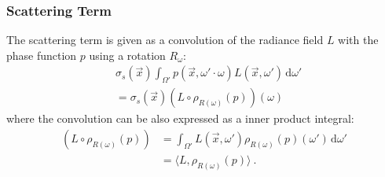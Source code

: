 \documentclass{egpubl}
\newcommand{\ud}{\,\mathrm{d}} %
\begin{document}
\subsubsection{Scattering Term}

The scattering term is given as a convolution of the radiance field $L$ with the phase function $p$ using a rotation $R_\omega$:
\begin{align*}
&
\sigma_s(\vec{x})\int_{\Omega'}p(\vec{x}, \omega'\cdot\omega)L(\vec{x}, \omega')\ud\omega'
\\
&= \sigma_s(\vec{x})(L\circ \rho_{R(\omega)}(p))(\omega)
\end{align*}
where the convolution can be also expressed as a inner product integral:
\begin{align*}
(L\circ \rho_{R(\omega)}(p)) &= \int_{\Omega'}{L(\vec{x}, \omega')\rho_{R(\omega)}(p)(\omega')\ud\omega'} \\
&= \langle L,  \rho_{R(\omega)}(p)\rangle \ .
\end{align*}
\end{document}
